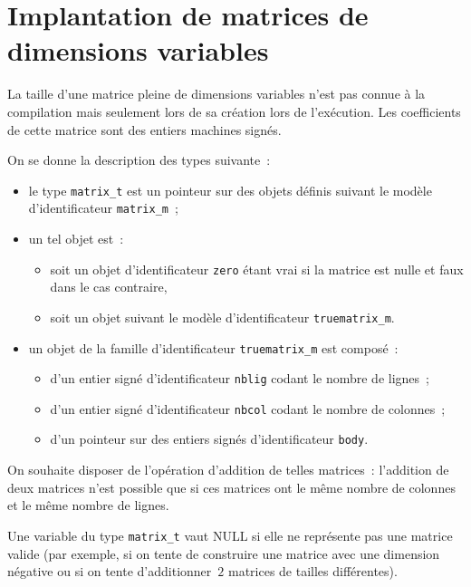 \section{Implantation de matrices de dimensions variables}
La taille d'une matrice pleine de dimensions variables n'est pas
connue \`a la compilation mais seulement lors de sa cr\'eation lors de
l'ex\'ecution.  Les coefficients de cette matrice sont des entiers machines sign\'es.

On se donne la description des types suivante~:
\begin{itemize}
\item le type \verb+matrix_t+ est un pointeur sur des objets
  d\'efinis suivant le mod\`ele d'identificateur \verb+matrix_m+~;
\item un tel objet est~:
  \begin{itemize}
  \item soit un objet d'identificateur \verb+zero+ \'etant vrai si la
    matrice est nulle et faux dans le cas contraire,
  \item soit un objet suivant le mod\`ele d'identificateur
    \verb+truematrix_m+.
  \end{itemize}
\item un objet de la famille d'identificateur \verb+truematrix_m+ est
  compos\'e~:
  \begin{itemize}
  \item d'un entier sign\'e d'identificateur \verb+nblig+ codant le
    nombre de lignes~;
  \item d'un entier sign\'e d'identificateur \verb+nbcol+ codant le
    nombre de colonnes~;
  \item d'un pointeur sur des entiers sign\'es d'identificateur
    \verb+body+.
  \end{itemize}
\end{itemize}
On souhaite disposer de l'op\'eration d'addition de telles matrices~:
l'addition de deux matrices n'est possible que si ces matrices ont le
m\^eme nombre de colonnes et le m\^eme nombre de lignes.
\par
Une variable du type \verb+matrix_t+ vaut NULL si elle ne repr\'esente
pas une matrice valide (par exemple, si on tente de construire une
matrice avec une dimension n\'egative ou si on tente d'additionner~$2$
matrices de tailles diff\'erentes).
